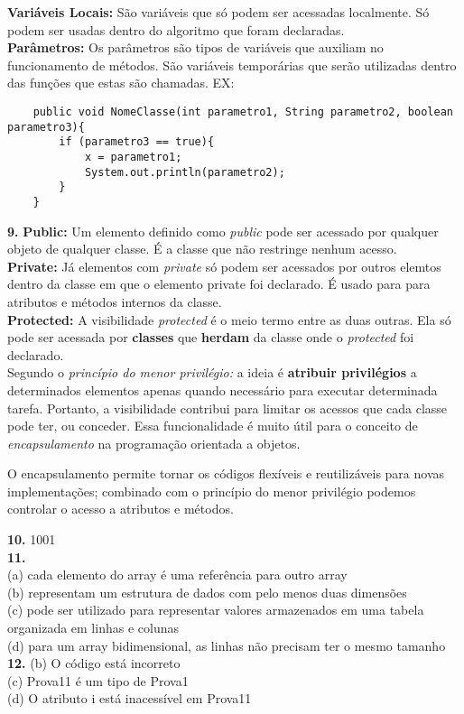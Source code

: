\documentclass[a4paper, 12pt]{article}
\begin{document}
\textbf{Variáveis Locais: }São variáveis que só podem ser acessadas localmente. Só podem ser usadas dentro do algoritmo que foram declaradas.\\

\textbf{Parâmetros: }Os parâmetros são tipos de variáveis que auxiliam no funcionamento de métodos. São variáveis temporárias que serão utilizadas dentro das funções que estas são chamadas. EX:\\

\begin{lstlisting}
	public void NomeClasse(int parametro1, String parametro2, boolean parametro3){
		if (parametro3 == true){
			x = parametro1;
			System.out.println(parametro2);	
		}
	}
\end{lstlisting}

\textbf{9.} \textbf{Public: }Um elemento definido como \textit{public} pode ser acessado por qualquer objeto de qualquer classe. É a classe que não restringe nenhum acesso.\\

\textbf{Private: }Já elementos com \textit{private} só podem ser acessados por outros elemtos dentro da classe em que o elemento private foi declarado. É usado para para atributos e métodos internos da classe.\\

\textbf{Protected: }A visibilidade \textit{protected} é o meio termo entre as duas outras. Ela só pode ser acessada por \textbf{classes} que \textbf{herdam} da classe onde o \textit{protected} foi declarado.\\

Segundo o \textit{princípio do menor privilégio:} a ideia é \textbf{atribuir privilégios} a determinados elementos apenas quando necessário para executar determinada tarefa. 
Portanto, a visibilidade contribui para limitar os acessos que cada classe pode ter, ou conceder. Essa funcionalidade é muito útil para o conceito de \textit{encapsulamento} na programação orientada a objetos. 

O encapsulamento permite tornar os códigos flexíveis e reutilizáveis para novas implementações; combinado com o princípio do menor privilégio podemos controlar o acesso a atributos e métodos.

\textbf{10.} 1001\\

\textbf{11.}\\ (a) cada elemento do array é uma referência para outro array\\
(b) representam um estrutura de dados com pelo menos duas dimensões\\
(c) pode ser utilizado para representar valores armazenados em uma tabela organizada em linhas e colunas\\
(d) para um array bidimensional, as linhas não precisam ter o mesmo tamanho\\

\textbf{12.} (b) O código está incorreto\\
(c) Prova11 é um tipo de Prova1\\
(d) O atributo i está inacessível em Prova11\\
\end{document}
